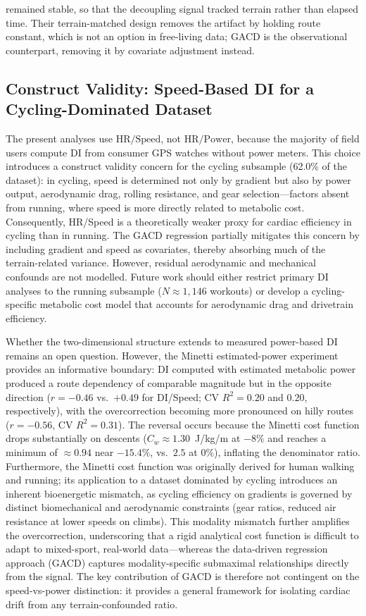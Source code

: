\documentclass[times, twoside]{zHenriquesLab-StyleBioRxiv}
\begin{document}
remained stable, so that the decoupling signal tracked terrain rather than elapsed time. Their terrain-matched design removes the artifact by holding route constant, which is not an option in free-living data; GACD is the observational counterpart, removing it by covariate adjustment instead.

\subsection*{Construct Validity: Speed-Based DI for a Cycling-Dominated Dataset}

The present analyses use $\text{HR}/\text{Speed}$, not $\text{HR}/\text{Power}$, because the majority of field users compute DI from consumer GPS watches without power meters. This choice introduces a construct validity concern for the cycling subsample (62.0\% of the dataset): in cycling, speed is determined not only by gradient but also by power output, aerodynamic drag, rolling resistance, and gear selection---factors absent from running, where speed is more directly related to metabolic cost. Consequently, HR/Speed is a theoretically weaker proxy for cardiac efficiency in cycling than in running. The GACD regression partially mitigates this concern by including gradient and speed as covariates, thereby absorbing much of the terrain-related variance. However, residual aerodynamic and mechanical confounds are not modelled. Future work should either restrict primary DI analyses to the running subsample ($N \approx 1{,}146$ workouts) or develop a cycling-specific metabolic cost model that accounts for aerodynamic drag and drivetrain efficiency.

Whether the two-dimensional structure extends to measured power-based DI remains an open question. However, the Minetti \cite{minetti2002} estimated-power experiment provides an informative boundary: DI computed with estimated metabolic power produced a route dependency of comparable magnitude but in the opposite direction ($r = -0.46$ vs.\ $+0.49$ for DI/Speed; CV $R^2 = 0.20$ and $0.20$, respectively), with the overcorrection becoming more pronounced on hilly routes ($r = -0.56$, CV $R^2 = 0.31$). The reversal occurs because the Minetti cost function drops substantially on descents ($C_w \approx 1.30$~J/kg/m at $-8\%$ and reaches a minimum of $\approx 0.94$ near $-15.4\%$, vs.\ $2.5$ at $0\%$), inflating the denominator ratio. Furthermore, the Minetti cost function was originally derived for human walking and running; its application to a dataset dominated by cycling introduces an inherent bioenergetic mismatch, as cycling efficiency on gradients is governed by distinct biomechanical and aerodynamic constraints (gear ratios, reduced air resistance at lower speeds on climbs). This modality mismatch further amplifies the overcorrection, underscoring that a rigid analytical cost function is difficult to adapt to mixed-sport, real-world data---whereas the data-driven regression approach (GACD) captures modality-specific submaximal relationships directly from the signal. The key contribution of GACD is therefore not contingent on the speed-vs-power distinction: it provides a general framework for isolating cardiac drift from any terrain-confounded ratio.
\end{document}
